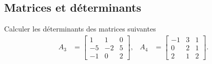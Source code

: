 \subsection{Matrices et déterminants}%

\begin{exercise} \label{exo:AlgLin-Det33}
  Calculer les déterminants des matrices suivantes 
  \begin{align*}
    A_3 & = \left[\begin{array}{rrr}
      1 & 1 & 0 \\ -5 & -2 & 5 \\ -1 & 0 & 2
      \end{array}\right], &
    A_4 & = \left[\begin{array}{rrr}
      -1 & 3 & 1 \\ 0 & 2 & 1 \\ 2 & 1 & 2
      \end{array}\right].  
  \end{align*}
\end{exercise}

